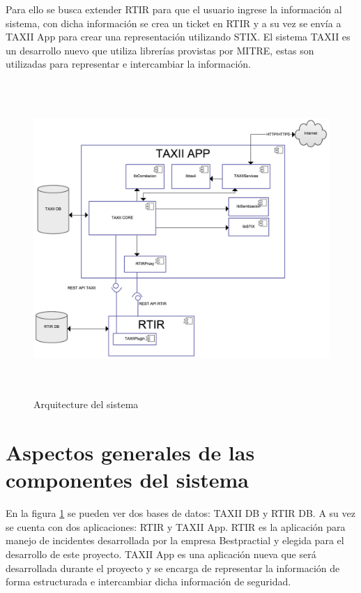 	\bigskip
	
	Para ello se busca extender RTIR para que el usuario ingrese la información al sistema, con
		dicha información se crea un ticket en RTIR y a su vez se envía a TAXII App para crear una representación utilizando
		STIX. El sistema TAXII es un desarrollo nuevo que utiliza librerías provistas por MITRE, estas son utilizadas para
		representar e intercambiar la información.
	
	
	\bigskip
	
	\begin{figure}[H]
		\centering
		\includegraphics[width=5.7638in,height=4.6846in]{Diseno21-img/Diseno21-img003.png} 
		\caption{Arquitecture del sistema}	
		\label{fig.arquitecturasistema}
	\end{figure}
	\bigskip
	
	
	\section{Aspectos generales de las componentes del sistema}
	
	

	En la figura \ref{fig.arquitecturasistema} se pueden ver dos bases de datos: TAXII DB y RTIR DB. A su vez se cuenta con dos
		aplicaciones: RTIR y TAXII App. RTIR es la aplicación para manejo de incidentes desarrollada por la empresa
		Bestpractial \cite{bp} y elegida para el desarrollo de este proyecto. TAXII App es una aplicación nueva que será
		desarrollada durante el proyecto y se encarga de representar la información de forma estructurada e intercambiar dicha
		información de seguridad.
    \bigskip
	
